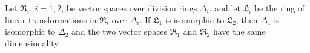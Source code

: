 Let $\mathfrak{R}_i$, $i = 1, 2$, be vector spaces over division rings $\Delta_i$, and let $\mathfrak{L}_i$ be the ring of linear transformations in $\mathfrak{R}_i$ over $\Delta_i$. If $\mathfrak{L}_1$ is isomorphic to $\mathfrak{L}_2$, then $\Delta_1$ is isomorphic to $\Delta_2$ and the two vector spaces $\mathfrak{R}_1$ and $\mathfrak{R}_2$ have the same dimensionality.
